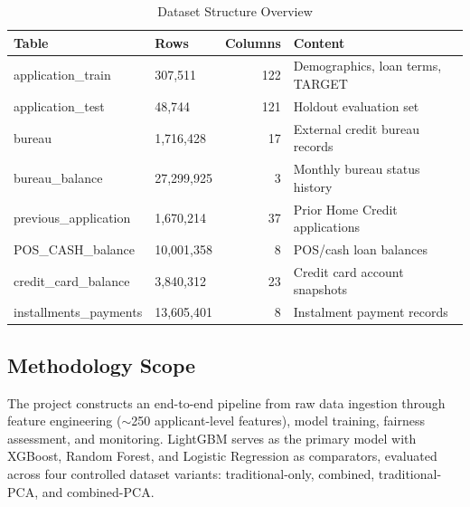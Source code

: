 \begin{table}[H]
\centering
\caption{Dataset Structure Overview}
\label{tab:dataset_overview}
\begin{tabular}{llrl}
\toprule
\textbf{Table} & \textbf{Rows} & \textbf{Columns} & \textbf{Content} \\
\midrule
application\_train & 307,511 & 122 & Demographics, loan terms, TARGET \\
application\_test & 48,744 & 121 & Holdout evaluation set \\
bureau & 1,716,428 & 17 & External credit bureau records \\
bureau\_balance & 27,299,925 & 3 & Monthly bureau status history \\
previous\_application & 1,670,214 & 37 & Prior Home Credit applications \\
POS\_CASH\_balance & 10,001,358 & 8 & POS/cash loan balances \\
credit\_card\_balance & 3,840,312 & 23 & Credit card account snapshots \\
installments\_payments & 13,605,401 & 8 & Instalment payment records \\
\bottomrule
\end{tabular}
\end{table}

\subsection{Methodology Scope}

The project constructs an end-to-end pipeline from raw data ingestion through feature engineering ($\sim$250 applicant-level features), model training, fairness assessment, and monitoring. LightGBM serves as the primary model with XGBoost, Random Forest, and Logistic Regression as comparators, evaluated across four controlled dataset variants: traditional-only, combined, traditional-PCA, and combined-PCA.


